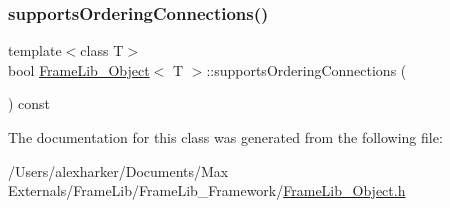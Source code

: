 \mbox{\label{class_frame_lib___object_a0f0baead3c4ca259a6b4e7a417f45735}} 
\subsubsection{\texorpdfstring{supports\+Ordering\+Connections()}{supportsOrderingConnections()}}
{\footnotesize\ttfamily template$<$class T$>$ \\
bool \hyperlink{class_frame_lib___object}{Frame\+Lib\+\_\+\+Object}$<$ T $>$\+::supports\+Ordering\+Connections (\begin{DoxyParamCaption}{ }\end{DoxyParamCaption}) const\hspace{0.3cm}{\ttfamily [inline]}}



The documentation for this class was generated from the following file\+:\begin{DoxyCompactItemize}
\item 
/\+Users/alexharker/\+Documents/\+Max Externals/\+Frame\+Lib/\+Frame\+Lib\+\_\+\+Framework/\hyperlink{_frame_lib___object_8h}{Frame\+Lib\+\_\+\+Object.\+h}\end{DoxyCompactItemize}
